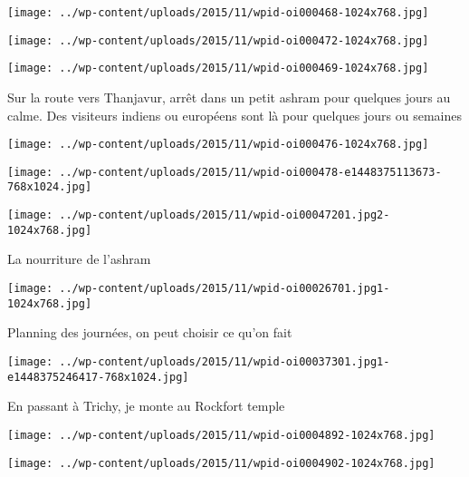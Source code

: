  \newline
\centerline{\texttt{[image: ../wp-content/uploads/2015/11/wpid-oi000468-1024x768.jpg]} } 
 \newline
 \newline
\centerline{\texttt{[image: ../wp-content/uploads/2015/11/wpid-oi000472-1024x768.jpg]} } 
 \newline
 \newline
\centerline{\texttt{[image: ../wp-content/uploads/2015/11/wpid-oi000469-1024x768.jpg]} } 
 \newline
 Sur la route vers Thanjavur, arrêt dans un petit ashram pour quelques jours au calme. Des visiteurs indiens ou européens sont là pour quelques jours ou semaines \newline
 \newline
\centerline{\texttt{[image: ../wp-content/uploads/2015/11/wpid-oi000476-1024x768.jpg]} } 
 \newline
 \newline
\centerline{\texttt{[image: ../wp-content/uploads/2015/11/wpid-oi000478-e1448375113673-768x1024.jpg]} } 
 \newline
 \newline
\centerline{\texttt{[image: ../wp-content/uploads/2015/11/wpid-oi00047201.jpg2-1024x768.jpg]} } 
 \newline
 La nourriture de l'ashram \newline
 \newline
\centerline{\texttt{[image: ../wp-content/uploads/2015/11/wpid-oi00026701.jpg1-1024x768.jpg]} } 
 \newline
 Planning des journées, on peut choisir ce qu'on fait \newline
 \newline
\centerline{\texttt{[image: ../wp-content/uploads/2015/11/wpid-oi00037301.jpg1-e1448375246417-768x1024.jpg]} } 
 \newline
 En passant à Trichy, je monte au Rockfort temple \newline
 \newline
\centerline{\texttt{[image: ../wp-content/uploads/2015/11/wpid-oi0004892-1024x768.jpg]} } 
 \newline
 \newline
\centerline{\texttt{[image: ../wp-content/uploads/2015/11/wpid-oi0004902-1024x768.jpg]} } 
 \newline
 \newline
